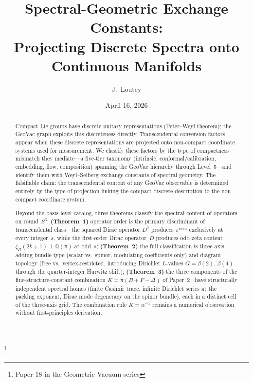 \documentclass[aps,pra,twocolumn,superscriptaddress,longbibliography]{revtex4-2}
\begin{document}
\title{Spectral-Geometric Exchange Constants:\\
Projecting Discrete Spectra onto Continuous Manifolds}
\thanks{Paper 18 in the Geometric Vacuum series}

\author{J.~Loutey}

\date{April 16, 2026}


\begin{abstract}
Compact Lie groups have discrete unitary representations
(Peter--Weyl theorem); the GeoVac graph exploits this discreteness
directly.  Transcendental conversion factors appear when these
discrete representations are projected onto non-compact coordinate
systems used for measurement.  We classify these factors by the
type of compactness mismatch they mediate---a five-tier taxonomy
(intrinsic, conformal/calibration, embedding, flow, composition)
spanning the GeoVac hierarchy through Level~5---and identify them
with Weyl--Selberg exchange constants of spectral geometry.  The
falsifiable claim: the transcendental content of any GeoVac
observable is determined entirely by the type of projection
linking the compact discrete description to the non-compact
coordinate system.

Beyond the basis-level catalog, three theorems classify the
spectral content of operators on round~$S^3$:
\textbf{(Theorem~1)} operator order is the primary discriminant
of transcendental class---the squared Dirac operator $D^2$ produces
$\pi^{\mathrm{even}}$ exclusively at every integer~$s$, while the
first-order Dirac operator~$D$ produces odd-zeta content
$\zeta_R(2k{+}1) \perp \mathbb{Q}(\pi)$ at odd~$s$;
\textbf{(Theorem~2)} the full classification is three-axis,
adding bundle type (scalar vs.\ spinor, modulating coefficients
only) and diagram topology (free vs.\ vertex-restricted, introducing
Dirichlet $L$-values $G = \beta(2)$, $\beta(4)$ through the
quarter-integer Hurwitz shift);
\textbf{(Theorem~3)} the three components of the
fine-structure-constant combination $K = \pi(B + F - \Delta)$ of
Paper~2~\cite{loutey_paper2} have structurally independent
spectral homes (finite Casimir trace, infinite Dirichlet series at
the packing exponent, Dirac mode degeneracy on the spinor bundle),
each in a distinct cell of the three-axis grid.  The combination
rule $K = \alpha^{-1}$ remains a numerical observation
without first-principles derivation.


\end{abstract}
\end{document}
